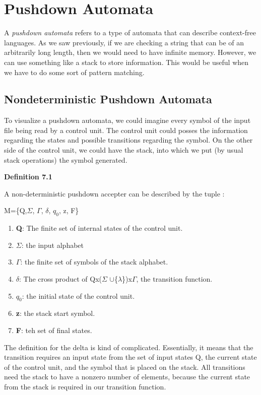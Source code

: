 \documentclass{article}
\begin{document}
\section{Pushdown Automata}
A \textit{pushdown automata} refers to a type of automata that can describe context-free languages. As we saw previously, if we 
are checking a string that can be of an arbitrarily long length, then we would need to have infinite memory. However, we can use 
something like a stack to store information. This would be useful when we have to do some sort of pattern matching.
\subsection{Nondeterministic Pushdown Automata}
To visualize a pushdown automata, we could imagine every symbol of the input file being read by a control unit. The control 
unit could posses the information regarding the states and possible transitions regarding the symbol. On the other side of the
control unit, we could have the stack, into which we put (by usual stack operations) the symbol generated.

\centerline{\textbf{Definition 7.1}}

A non-deterministic pushdown accepter can be described by the tuple :

\centerline{M=\{Q,$\Sigma$, $\Gamma$, $\delta$, $q_0$, z, F\}}

\begin{enumerate}
		\item{\textbf{Q}}: The finite set of internal states of the control unit.
		\item{\textbf{$\Sigma$}}: the input alphabet
		\item{\textbf{$\Gamma$}}: the finite set of symbols of the stack alphabet. 
		\item{\textbf{$\delta$}}: The cross product of Qx($\Sigma$ $\cup$\{$\lambda$\})x$\Gamma$, the transition function.
		\item{\textbf{$q_0$}}: the initial state of the control unit.
		\item{\textbf{z}}: the stack start symbol.
		\item{\textbf{F}}: teh set of final states.
\end{enumerate}
The definition for the delta is kind of complicated. Essentially, it means  that the transition requires an input state from
the set of input states Q, the current state of the control unit, and the symbol that is placed on the stack. All transitions need
the stack to have a nonzero number of elements, because the current state from the stack is required in our transition function.
\end{document}

